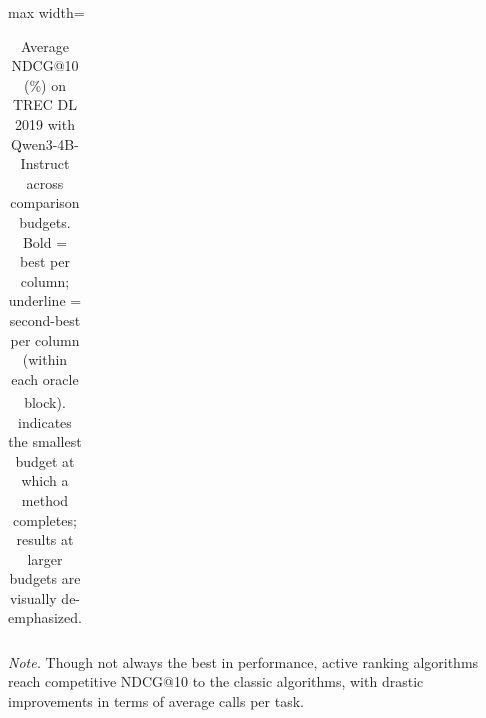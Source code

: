 \documentclass[11pt]{article}
\begin{document}
\begin{table}[H]
\begin{adjustbox}{max width=\textwidth}
\begin{tabular}{c l rrrrrrrrr}
\bottomrule
\end{tabular}%
\end{adjustbox}
\caption{Average NDCG@10 (\%) on TREC DL 2019 with Qwen3-4B-Instruct across comparison budgets. Bold = best per column; underline = second-best per column (within each oracle block). \textsuperscript{\textdagger} indicates the smallest budget at which a method completes; results at larger budgets are visually de-emphasized.}
\label{tab:budget_ndcg10_oracles_qwen3_4b_dl2019}
\par\vspace{2pt}\footnotesize\noindent\textit{Note.} Though not always the best in performance, active ranking algorithms reach competitive NDCG@10 to the classic algorithms, with drastic improvements in terms of average calls per task.


\end{table}
\end{document}
